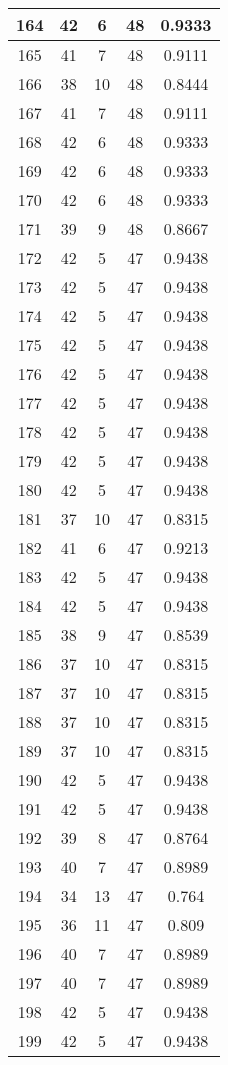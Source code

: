 \documentclass[letterpaper, 12pt]{article}
\begin{document}
\begin{longtable}{|c|c|c|c|c|}
\hline
164 & 42 & 6 & 48 & 0.9333 \\
\hline
165 & 41 & 7 & 48 & 0.9111 \\
\hline
166 & 38 & 10 & 48 & 0.8444 \\
\hline
167 & 41 & 7 & 48 & 0.9111 \\
\hline
168 & 42 & 6 & 48 & 0.9333 \\
\hline
169 & 42 & 6 & 48 & 0.9333 \\
\hline
170 & 42 & 6 & 48 & 0.9333 \\
\hline
171 & 39 & 9 & 48 & 0.8667 \\
\hline
172 & 42 & 5 & 47 & 0.9438 \\
\hline
173 & 42 & 5 & 47 & 0.9438 \\
\hline
174 & 42 & 5 & 47 & 0.9438 \\
\hline
175 & 42 & 5 & 47 & 0.9438 \\
\hline
176 & 42 & 5 & 47 & 0.9438 \\
\hline
177 & 42 & 5 & 47 & 0.9438 \\
\hline
178 & 42 & 5 & 47 & 0.9438 \\
\hline
179 & 42 & 5 & 47 & 0.9438 \\
\hline
180 & 42 & 5 & 47 & 0.9438 \\
\hline
181 & 37 & 10 & 47 & 0.8315 \\
\hline
182 & 41 & 6 & 47 & 0.9213 \\
\hline
183 & 42 & 5 & 47 & 0.9438 \\
\hline
184 & 42 & 5 & 47 & 0.9438 \\
\hline
185 & 38 & 9 & 47 & 0.8539 \\
\hline
186 & 37 & 10 & 47 & 0.8315 \\
\hline
187 & 37 & 10 & 47 & 0.8315 \\
\hline
188 & 37 & 10 & 47 & 0.8315 \\
\hline
189 & 37 & 10 & 47 & 0.8315 \\
\hline
190 & 42 & 5 & 47 & 0.9438 \\
\hline
191 & 42 & 5 & 47 & 0.9438 \\
\hline
192 & 39 & 8 & 47 & 0.8764 \\
\hline
193 & 40 & 7 & 47 & 0.8989 \\
\hline
194 & 34 & 13 & 47 & 0.764 \\
\hline
195 & 36 & 11 & 47 & 0.809 \\
\hline
196 & 40 & 7 & 47 & 0.8989 \\
\hline
197 & 40 & 7 & 47 & 0.8989 \\
\hline
198 & 42 & 5 & 47 & 0.9438 \\
\hline
199 & 42 & 5 & 47 & 0.9438 \\
\hline
\end{longtable}
\end{document}

